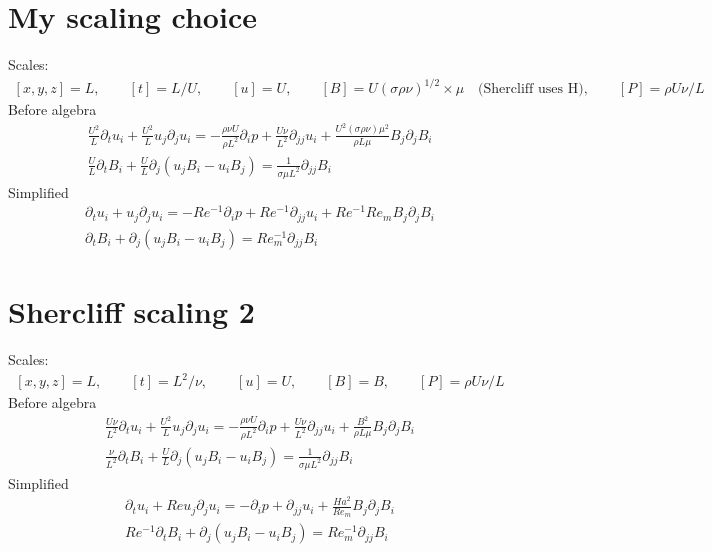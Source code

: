 \documentclass[11pt]{article}
\newcommand{\PD}{\partial}
\begin{document}
\section{My scaling choice}
Scales:
\begin{equation}\begin{aligned}
	[x,y,z] = L, \qquad
	[t] = L / U, \qquad
	[u] = U, \qquad
	[B] = U (\sigma \rho \nu)^{1/2} \times \mu \quad \text{(Shercliff uses H)}, \qquad
	[P] = \rho U \nu / L
\end{aligned} \end{equation}
Before algebra
\begin{equation}\begin{aligned}
\frac{U^2}{L} \PD_t u_i+ \frac{U^2}{L} u_j\PD_j u_i =-\frac{\rho \nu U}{\rho L^2}\PD_i p+ \frac{U \nu}{L^2} \PD_{jj} u_i + \frac{U^2 (\sigma \rho \nu) \mu^2}{\rho L \mu} B_j \PD_j B_i \\
\frac{U}{L} \PD_t B_i + \frac{U}{L} \PD_j (u_j B_i - u_i B_j) = \frac{1}{\sigma \mu L^2} \PD_{jj} B_i
\end{aligned} \end{equation}
Simplified
\begin{equation}\begin{aligned}
\PD_t u_i + u_j \PD_j u_i = -Re^{-1}\PD_i p + Re^{-1} \PD_{jj} u_i + Re^{-1} Re_m B_j \PD_j B_i \\
\PD_t B_i + \PD_j (u_j B_i - u_i B_j) = Re_m^{-1} \PD_{jj} B_i
\end{aligned} \end{equation}

\section{Shercliff scaling 2}
Scales:
\begin{equation}\begin{aligned}
	[x,y,z] = L, \qquad
	[t] = L^2 / \nu, \qquad
	[u] = U, \qquad
	[B] = B, \qquad
	[P] = \rho U \nu / L
\end{aligned} \end{equation}
Before algebra
\begin{equation}\begin{aligned}
\frac{U \nu}{L^2} \PD_t u_i+ \frac{U^2}{L} u_j\PD_j u_i =-\frac{\rho \nu U}{\rho L^2}\PD_i p+ \frac{U \nu}{L^2} \PD_{jj} u_i + \frac{B^2}{\rho L \mu} B_j \PD_j B_i \\
\frac{\nu}{L^2} \PD_t B_i + \frac{U}{L} \PD_j (u_j B_i - u_i B_j) = \frac{1}{\sigma \mu L^2} \PD_{jj} B_i
\end{aligned} \end{equation}
Simplified
\begin{equation}\begin{aligned}
\PD_t u_i+ Re u_j\PD_j u_i =-\PD_i p+ \PD_{jj} u_i + \frac{Ha^2}{Re_m} B_j \PD_j B_i \\
Re^{-1} \PD_t B_i + \PD_j (u_j B_i - u_i B_j) = Re_m^{-1} \PD_{jj} B_i
\end{aligned} \end{equation}
\end{document}
